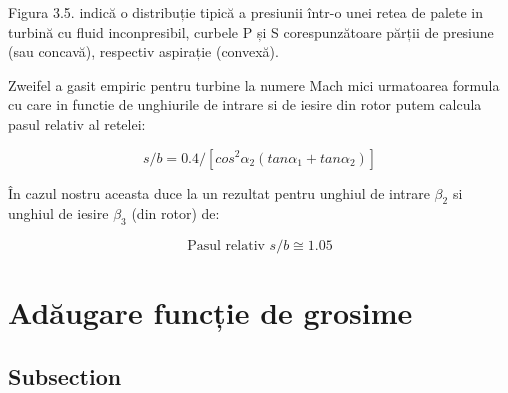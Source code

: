 Figura 3.5. indică o distribuție tipică a presiunii într-o unei retea de palete in turbină cu fluid inconpresibil, curbele P și S corespunzătoare părții de presiune (sau concavă), respectiv aspirație (convexă).

Zweifel a gasit empiric pentru turbine la numere Mach mici urmatoarea formula cu care in functie de unghiurile de intrare si de iesire din rotor putem calcula pasul relativ al retelei:

\begin{equation}
s/b = 0.4 / [cos^2\alpha_2 (tan\alpha_1 + tan\alpha_2)]
\end{equation}

În cazul nostru aceasta duce la un rezultat pentru unghiul de intrare $\beta_2$ si unghiul de iesire $\beta_3$ (din rotor) de:

\begin{equation}
\text{Pasul relativ } s/b \cong 1.05
\end{equation}

\clearpage

\section{Adăugare funcție de grosime}

\subsection{Subsection}